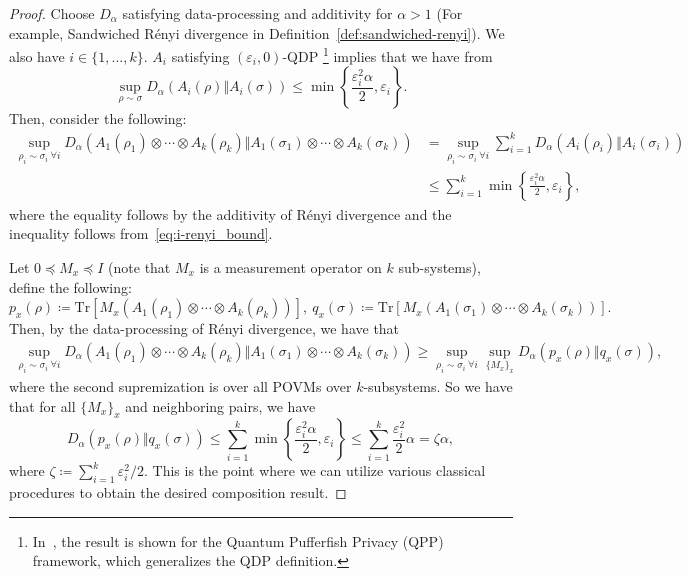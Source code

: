 \documentclass[11pt]{article}
\def\Tr{\mathrm{Tr}}
\theoremstyle{plain}
\theoremstyle{remark}
\begin{document}
\begin{proof}
Choose $D_\alpha$ satisfying data-processing and additivity for $\alpha>1$ (For example, Sandwiched R\'enyi divergence in Definition~\ref{def:sandwiched-renyi}). We also have $i \in \{1, \ldots, k\}$. 
$A_i$
    satisfying $(\varepsilon_i, 0)$-QDP \footnote{{In~\citep{NuradhaGW24}, the result is shown for the Quantum Pufferfish Privacy (QPP) framework,
    which generalizes the QDP definition.}}
    implies that we have from~\cite[Proposition~9, Proposition~13]{NuradhaGW24} 
    \begin{equation}
        \sup_{\rho \sim \sigma} D_\alpha( A_i (\rho) \Vert A_i(\sigma)) \leq \min \left\{ \frac{\varepsilon_i^2 \alpha}{2}, \varepsilon_i \right\}. \label{eq:i-renyi_bound}
    \end{equation}
  Then, consider the following:
\begin{align}
    \sup_{\rho_i \sim \sigma_i \ \forall i } D_{\alpha}\left( A_1(\rho_1)  \otimes \cdots \otimes A_k(\rho_k) \Vert A_1(\sigma_1)  \otimes \cdots \otimes A_k(\sigma_k) \right)  & =  \sup_{\rho_i \sim \sigma_i \ \forall i }  \sum_{i=1}^k D_{\alpha}\left( A_i(\rho_i)  \Vert A_i(\sigma_i)  \right) \\ 
   & \leq \sum_{i=1}^k  \min \left\{ \frac{\varepsilon_i^2 \alpha}{2}, \varepsilon_i \right\},
\end{align}
where the equality follows by the additivity of R\'enyi divergence and the inequality follows from~\eqref{eq:i-renyi_bound}.


Let $0 \preceq M_x \preceq I$ (note that $M_x$ is a measurement operator on $k$ sub-systems), define the following:
$
    p_x(\rho)  \coloneqq \Tr\!\left[M_x \left( A_1(\rho_1)  \otimes \cdots \otimes A_k(\rho_k)\right)\right], \
     q_x(\sigma) \coloneqq \Tr\!\left[M_x \left(A_1(\sigma_1)  \otimes \cdots \otimes A_k(\sigma_k) \right) \right].
$
Then, by the data-processing of R\'enyi divergence, we have that 
\begin{align}
    \sup_{\rho_i \sim \sigma_i \ \forall i } D_{\alpha}\left( A_1(\rho_1)  \otimes \cdots \otimes A_k(\rho_k) \Vert A_1(\sigma_1)  \otimes \cdots \otimes A_k(\sigma_k) \right)  \geq  \sup_{\rho_i \sim \sigma_i \ \forall i } \sup_{\{M_x\}_x} D_\alpha( p_x(\rho) \Vert q_x(\sigma)),
\end{align}
where the second supremization is over all POVMs over $k$-subsystems. 
So we have that for all $\{M_x\}_x$ and neighboring pairs, we have 
\begin{equation}
   D_\alpha( p_x(\rho) \Vert q_x(\sigma))   \leq \sum_{i=1}^k  \min \left\{ \frac{\varepsilon_i^2 \alpha}{2}, \varepsilon_i \right\} \leq \sum_{i=1}^k \frac{\varepsilon_i^2 }{2} \alpha = \zeta \alpha, \label{eq:upper_bound_with_Zeta}
\end{equation}
where $\zeta \coloneq \sum_{i=1}^k \varepsilon_i^2/2$. 
This is the point where we can utilize various classical procedures to obtain the desired composition result. 


\end{proof}
\end{document}
